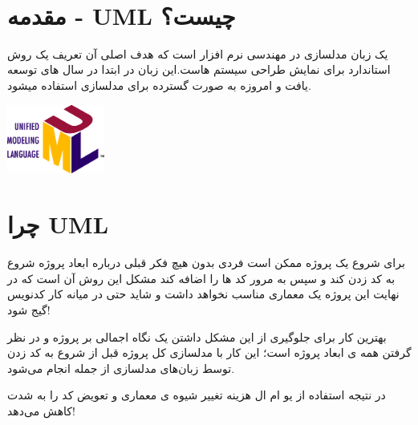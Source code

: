 \documentclass[]{article}
\begin{document}
\newpage
\pagestyle{fancy}
\fancyhf{}
\fancyfoot{}
\cfoot{\thepage}
\renewcommand{\headrulewidth}{2pt}

\KashidaOff


 \Large \textbf{\\
}


\section*{{\titr مقدمه - UML چیست؟}}

 یک زبان مدلسازی در مهندسی نرم افزار است که هدف اصلی آن تعریف یک روش استاندارد برای نمایش طراحی سیستم هاست.این زبان در ابتدا در سال های   توسعه یافت و امروزه به صورت گسترده برای مدلسازی استفاده میشود.

\begin{center}

\includegraphics[width=0.24\textwidth]{images/image4.png}

\end{center}



\section*{{\titr چرا UML}}

برای شروع یک پروژه ممکن است فردی بدون هیچ فکر قبلی درباره ابعاد پروژه شروع به کد زدن کند و سپس به مرور کد ها را اضافه کند مشکل این روش آن است که در نهایت این پروژه یک معماری مناسب نخواهد داشت و شاید حتی در میانه کار کدنویس گیج شود!

 بهترین کار برای جلوگیری از این مشکل داشتن یک نگاه اجمالی بر پروژه  و در نظر گرفتن همه ی ابعاد پروژه است؛ این کار با مدلسازی کل پروژه قبل از شروع به کد زدن توسط زبان‌های مدلسازی از جمله  انجام می‌شود.
 
در نتیجه استفاده از یو ام ال هزینه تغییر شیوه ی معماری و تعویض کد را به شدت کاهش می‌دهد!
\end{document}
